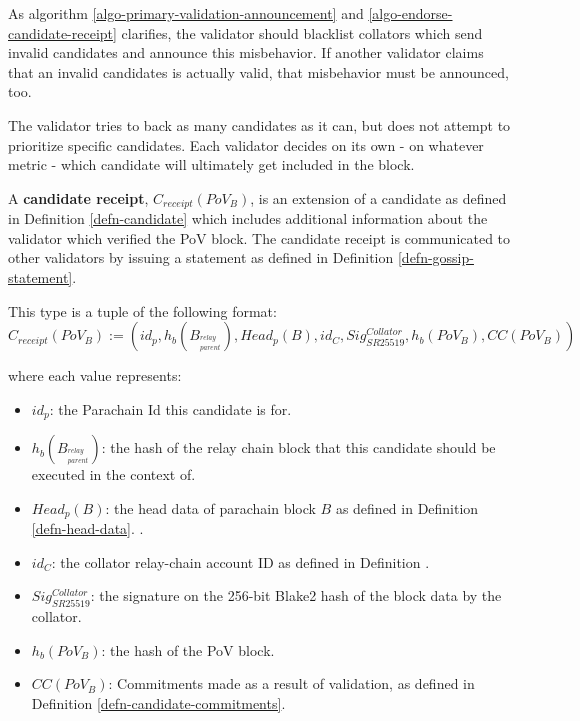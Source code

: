 As algorithm \ref{algo-primary-validation-announcement} and
\ref{algo-endorse-candidate-receipt} clarifies, the validator should blacklist
collators which send invalid candidates and announce this misbehavior. If
another validator claims that an invalid candidates is actually valid, that
misbehavior must be announced, too. 
\newline

The validator tries to back as many candidates as it can, but does not attempt to prioritize
specific candidates. Each validator decides on its own - on whatever metric - which candidate
will ultimately get included in the block.

\begin{definition}
  \label{defn-candidate-receipt}
  A \textbf{candidate receipt}, $C_{receipt}(PoV_B)$, is an extension of a candidate
  as defined in Definition \ref{defn-candidate} which includes additional
  information about the validator which verified the PoV block. The candidate
  receipt is communicated to other validators by issuing a statement as defined
  in Definition \ref{defn-gossip-statement}.
  \newline

  This type is a tuple of the following format:
  \[
  C_{receipt}(PoV_B) := (id_p, h_b({B_{^{relay}_{parent}}}), Head_p(B), id_{C}, Sig^{Collator}_{SR25519}, h_b({PoV_B}), CC(PoV_B))
  \]

  where each value represents:
  \begin{itemize}
    \item $id_p$: the Parachain Id this candidate is for.
    \item $h_b({B_{^{relay}_{parent}}})$: the hash of the relay chain block that this
    candidate should be executed in the context of.
    \item $Head_p(B)$: the head data of parachain block $B$ as defined in Definition \ref{defn-head-data}.
    .
    \item $id_C$: the collator relay-chain account ID as defined in Definition
    .
    \item $Sig^{Collator}_{SR25519}$: the signature on the 256-bit Blake2 hash
    of the block data by the collator.
    \item $h_b({PoV_B})$: the hash of the PoV block.
    \item $CC(PoV_B)$: Commitments made as a result of validation, as defined in
    Definition \ref{defn-candidate-commitments}.
  \end{itemize}
\end{definition}

